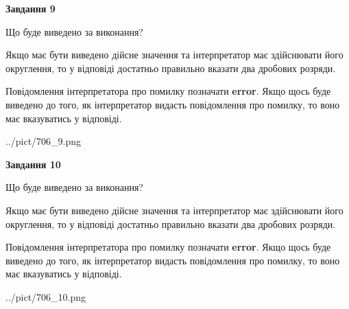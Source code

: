 \documentclass[12pt, ukrainian]{article}
\begin{document}
{\begin {Large}
{\begin {center}\textbf{Завдання 9}\end {center}}\par
Що буде виведено за виконання? \par

Якщо має бути виведено дійсне значення та інтерпретатор має здійснювати його округлення, 
то у відповіді достатньо правильно вказати два дробових розряди.

Повідомлення інтерпретатора про помилку позначати \textbf{error}.
Якщо щось буде виведено до того, як інтерпретатор видасть повідомлення про помилку, 
то воно має вказуватись у відповіді. \par

\begin{center}
	{../pict/706_9.png}
\end{center}
\newpage

{\begin {center}\textbf{Завдання 10}\end {center}}\par
Що буде виведено за виконання? \par

Якщо має бути виведено дійсне значення та інтерпретатор має здійснювати його округлення, 
то у відповіді достатньо правильно вказати два дробових розряди.

Повідомлення інтерпретатора про помилку позначати \textbf{error}.
Якщо щось буде виведено до того, як інтерпретатор видасть повідомлення про помилку, 
то воно має вказуватись у відповіді. \par

\begin{center}
	{../pict/706_10.png}
\end{center}
\newpage

\end {Large}}
\end{document}
